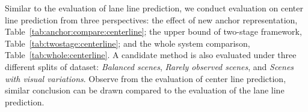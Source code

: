 \documentclass[10pt,twocolumn,letterpaper]{article}
\begin{document}
Similar to the evaluation of lane line prediction, we conduct evaluation on center line prediction from three perspectives: the effect of new anchor representation, Table~\ref{tab:anchor:compare:centerline}; the upper bound of two-stage framework, Table~\ref{tab:twostage:centerline}; and the whole system comparison, Table~\ref{tab:whole:centerline}. A candidate method is also evaluated under three different splits of dataset: {\it Balanced scenes}, {\it Rarely observed scenes}, and {\it Scenes with visual variations}. Observe from the evaluation of center line prediction, similar conclusion can be drawn compared to the evaluation of the lane line prediction.




\end{document}
